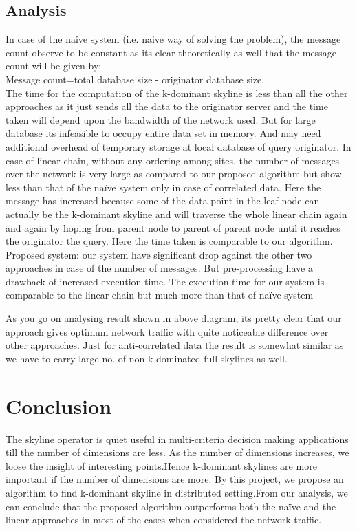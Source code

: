 \documentclass[twocolumn]{article}
\begin{document}
\subsection{Analysis}
In case of the naive system (i.e. naive way of solving the problem), the message count observe to  be constant as its clear theoretically as well that the message count will be given by:
\\
Message count=total database size - originator database size.
\\
The time for the computation of the k-dominant skyline is less than all the other approaches as it just sends all the data to the originator server and the time taken will depend upon the bandwidth of the network used. But for large database its infeasible to occupy entire data set in memory. And may need additional overhead of temporary storage at local database of query originator.
In case of linear chain, without any ordering among sites, the number of messages over the network is very large as compared to our proposed algorithm but show less than that of the naïve system only in case of correlated data. Here the message has increased because some of the data point in the leaf node can actually be the k-dominant skyline and will traverse the whole linear chain again and again by hoping from parent node to parent of parent node until it reaches the originator the query.
Here the time taken is comparable to our algorithm. 
Proposed system: our system have significant drop against the other two approaches in case of the number of messages. But pre-processing have a drawback of increased execution time. The execution time for our system is comparable to the linear chain but much more than that of naïve system

As you go on analysing result shown in above diagram, its pretty clear that our approach gives optimum network traffic with quite noticeable difference over other approaches. Just for anti-correlated data the result is somewhat similar as we have to carry large no. of non-k-dominated full skylines as well.

\section{Conclusion}
The skyline operator is quiet useful in multi-criteria decision making applications till the number of dimensions are less. As the number of dimensions increases, we loose the insight of interesting points.Hence k-dominant skylines are more important if the number of dimensions are more. By this project, we propose an algorithm to find k-dominant skyline in distributed setting.From our analysis, we can conclude that the proposed algorithm outperforms both the naïve and the linear approaches in most of the cases when considered the network traffic.



\end{document}
